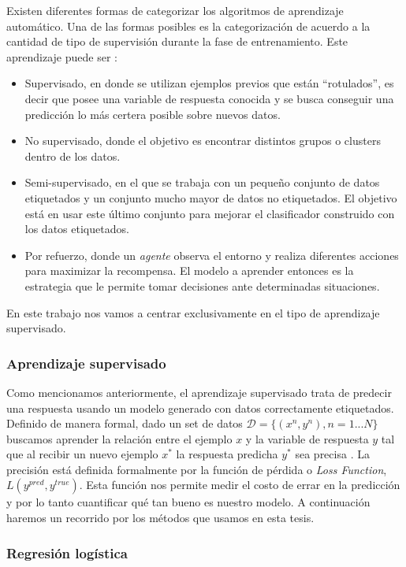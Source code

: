 Existen diferentes formas de categorizar los algoritmos de aprendizaje automático. Una de las formas posibles es la categorización de acuerdo a la cantidad de tipo de supervisión durante la fase de entrenamiento. Este aprendizaje puede ser \cite{Barber2011}:

\begin{itemize}
\item Supervisado, en donde se utilizan ejemplos previos que están ``rotulados'', es decir que posee una variable de respuesta conocida y se busca conseguir una predicción lo más certera posible sobre nuevos datos. 
\item No supervisado, donde el objetivo es encontrar distintos grupos o clusters dentro de los datos.
\item Semi-supervisado, en el que se trabaja con un pequeño conjunto de datos etiquetados y un conjunto mucho mayor de datos no etiquetados. El objetivo está en usar este último conjunto para mejorar el clasificador construido con los datos etiquetados.
\item Por refuerzo, donde un \textit{agente} observa el entorno y realiza diferentes acciones para maximizar la recompensa. El modelo a aprender entonces es la estrategia que le permite tomar decisiones ante determinadas situaciones. 
\end{itemize}

En este trabajo nos vamos a centrar exclusivamente en el tipo de aprendizaje supervisado.

\subsubsection{Aprendizaje supervisado}

Como mencionamos anteriormente, el aprendizaje supervisado trata de predecir una respuesta usando un modelo generado con datos correctamente etiquetados. Definido de manera formal, dado un set de datos $ \mathcal{D} = \{(x^n, y^n), n = 1...N\}$  buscamos aprender la relación entre el ejemplo $x$ y la variable de respuesta $y$ tal que al recibir un nuevo ejemplo $x^*$ la respuesta predicha $y^*$ sea precisa \cite{Barber2011}. La precisión está definida formalmente por la función de pérdida o \textit{Loss Function}, $L(y^{pred}, y^{true})$. Esta función nos permite medir el costo de errar en la predicción y por lo tanto cuantificar qué tan bueno es nuestro modelo. A continuación haremos un recorrido por los métodos que usamos en esta tesis.

\subsubsection{Regresión logística}

